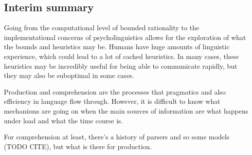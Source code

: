 \documentclass[]{article}
\begin{document}
\subsection{Interim summary}

Going from the computational level of bounded rationality to the implementational concerns of psycholinguistics allows for the exploration of what the bounds and heuristics may be. Humans have huge amounts of linguistic experience, which could lead to a lot of cached heuristics. In many cases, these heuristics may be incredibly useful for being able to communicate rapidly, but they may also be suboptimal in some cases. 

Production and comprehension are the processes that pragmatics and also efficiency in language flow through. However, it is difficult to know what mechanisms are going on when the main sources of information are what happens under load and what the time course is. 

For comprehension at least, there's a history of parsers and so some models (TODO CITE), but what is there for production. 





%
%
%
%
%
\end{document}
